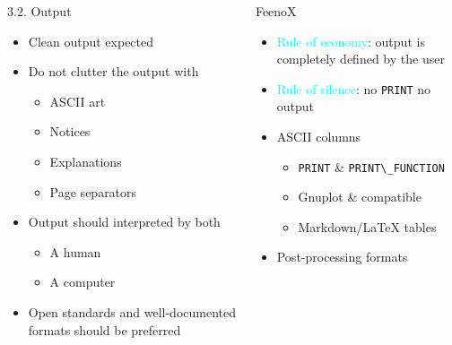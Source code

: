 \documentclass[
  ignorenonframetext,
  aspectratio=169,
]{beamer}
\newcommand{\passthrough}[1]{#1}
\providecommand{\tightlist}{%
  \setlength{\itemsep}{0pt}\setlength{\parskip}{0pt}}
\begin{document}
\begin{frame}[fragile]{}
\protect\hypertarget{section-10}{}
\begin{columns}[T]
\begin{column}{0.5\textwidth}
\begin{block}{3.2. Output}
\protect\hypertarget{output}{}
\begin{itemize}
\tightlist
\item
  Clean output expected
\item
  Do not clutter the output with

  \begin{itemize}
  \tightlist
  \item
    ASCII art
  \item
    Notices
  \item
    Explanations
  \item
    Page separators
  \end{itemize}
\item
  Output should interpreted by both

  \begin{itemize}
  \tightlist
  \item
    A human
  \item
    A computer
  \end{itemize}
\item
  Open standards and well-documented formats should be preferred
\end{itemize}
\end{block}
\end{column}

\pause

\begin{column}{0.5\textwidth}
\begin{exampleblock}{FeenoX}
\protect\hypertarget{feenox-8}{}
\begin{itemize}
\tightlist
\item
  {\textcolor{cyan}{Rule of {economy}}}: output is completely defined by
  the user
\item
  {\textcolor{cyan}{Rule of {silence}}}: no
  \passthrough{\lstinline!PRINT!} no output
\item
  ASCII columns

  \begin{itemize}
  \tightlist
  \item
    \passthrough{\lstinline!PRINT!} \&
    \passthrough{\lstinline!PRINT\_FUNCTION!}
  \item
    Gnuplot \& compatible
  \item
    Markdown/LaTeX tables
  \end{itemize}
\item
  Post-processing formats


\end{itemize}
\end{exampleblock}
\end{column}
\end{columns}
\end{frame}
\end{document}

